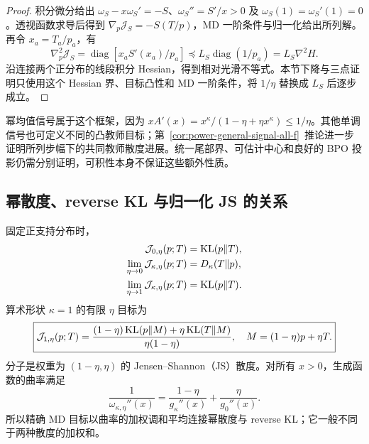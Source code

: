 \begin{proof}
积分微分给出 $\omega_S-x\omega_S'=-S$、$\omega_S''=S'/x>0$ 及 $\omega_S(1)=\omega_S'(1)=0$。透视函数求导后得到 $\nabla_p\mathcal J_S=-S(T/p)$，MD 一阶条件与归一化给出所列解。再令 $x_a=T_a/p_a$，有
\begin{equation}
 \nabla_p^2\mathcal J_S
 =\operatorname{diag}[x_aS'(x_a)/p_a]
 \preceq L_S\operatorname{diag}(1/p_a)=L_S\nabla^2H.
\end{equation}
沿连接两个正分布的线段积分 Hessian，得到相对光滑不等式。本节下降与三点证明只使用这个 Hessian 界、目标凸性和 MD 一阶条件，将 $1/\eta$ 替换成 $L_S$ 后逐步成立。
\end{proof}

幂均值信号属于这个框架，因为 $xA'(x)=x^\kappa/(1-\eta+\eta x^\kappa)\le1/\eta$。其他单调信号也可定义不同的凸教师目标；第~\ref{cor:power-general-signal-all-f}~推论进一步证明所列步幅下的共同教师散度进展。统一尾部界、可估计中心和良好的 BPO 投影仍需分别证明，可积性本身不保证这些额外性质。

\subsection{幂散度、reverse KL 与归一化 JS 的关系}

\begin{theorem}[精确 MD 目标的端点与曲率插值]
\label{thm:power-md-objective-endpoints}
固定正支持分布时，
\begin{align}
 \mathcal J_{0,\eta}(p;T)&=\operatorname{KL}(p\Vert T),\\
 \lim_{\eta\to0}\mathcal J_{\kappa,\eta}(p;T)&=D_\kappa(T\Vert p),\\
 \lim_{\eta\to1}\mathcal J_{\kappa,\eta}(p;T)&=\operatorname{KL}(p\Vert T).
 \label{eq:power-md-objective-limits}
\end{align}
算术形状 $\kappa=1$ 的有限 $\eta$ 目标为
\begin{equation}
 \boxed{\mathcal J_{1,\eta}(p;T)
 =\frac{(1-\eta)\operatorname{KL}(p\Vert M)+\eta\operatorname{KL}(T\Vert M)}{\eta(1-\eta)},
 \quad M=(1-\eta)p+\eta T.}
 \label{eq:power-md-js-endpoint}
\end{equation}
分子是权重为 $(1-\eta,\eta)$ 的 Jensen--Shannon（JS）散度。对所有 $x>0$，生成函数的曲率满足
\begin{equation}
 \frac1{\omega_{\kappa,\eta}''(x)}
 =\frac{1-\eta}{g_\kappa''(x)}+\frac\eta{g_0''(x)}.
 \label{eq:power-md-harmonic-curvature}
\end{equation}
所以精确 MD 目标以曲率的加权调和平均连接幂散度与 reverse KL；它一般不同于两种散度的加权和。
\end{theorem}

